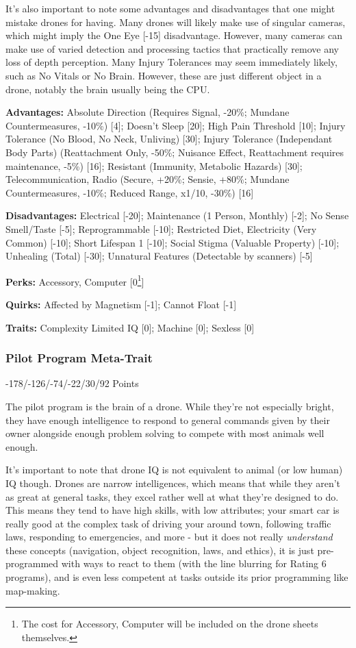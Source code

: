 It's also important to note some advantages and disadvantages that one might mistake drones for having. Many drones will likely make use of singular cameras, which might imply the One Eye [-15] disadvantage. However, many cameras can make use of varied detection and processing tactics that practically remove any loss of depth perception. Many Injury Tolerances may seem immediately likely, such as No Vitals or No Brain. However, these are just different object in a drone, notably the brain usually being the CPU.

\textbf{Advantages:} 
Absolute Direction (Requires Signal, -20\%; Mundane Countermeasures, -10\%) [4]; Doesn't Sleep [20]; High Pain Threshold [10]; Injury Tolerance (No Blood, No Neck, Unliving) [30]; Injury Tolerance (Independant Body Parts) (Reattachment Only, -50\%; Nuisance Effect, Reattachment requires maintenance, -5\%) [16]; Resistant (Immunity, Metabolic Hazards) [30]; Telecommunication, Radio (Secure, +20\%; Sensie, +80\%; Mundane Countermeasures, -10\%; Reduced Range, x1/10, -30\%) [16]

\textbf{Disadvantages:} 
Electrical [-20]; Maintenance (1 Person, Monthly) [-2]; No Sense Smell/Taste [-5]; Reprogrammable [-10]; Restricted Diet, Electricity (Very Common) [-10]; Short Lifespan 1 [-10]; Social Stigma (Valuable Property) [-10]; Unhealing (Total) [-30]; Unnatural Features (Detectable by scanners) [-5]

\textbf{Perks:}
Accessory, Computer [0\footnote{The cost for Accessory, Computer will be included on the drone sheets themselves.}]

\textbf{Quirks:}
Affected by Magnetism [-1]; Cannot Float [-1]

\textbf{Traits:}
Complexity Limited IQ [0]; Machine [0]; Sexless [0]

\subsubsection{Pilot Program Meta-Trait}
\begin{flushright}
	-178/-126/-74/-22/30/92 Points
\end{flushright}

The pilot program is the brain of a drone. While they're not especially bright, they have enough intelligence to respond to general commands given by their owner alongside enough problem solving to compete with most animals well enough. 

It's important to note that drone IQ is not equivalent to animal (or low human) IQ though. Drones are narrow intelligences, which means that while they aren't as great at general tasks, they excel rather well at what they're designed to do. This means they tend to have high skills, with low attributes; your smart car is really good at the complex task of driving your around town, following traffic laws, responding to emergencies, and more - but it does not really \textit{understand} these concepts (navigation, object recognition, laws, and ethics), it is just pre-programmed with ways to react to them (with the line blurring for Rating 6 programs), and is even less competent at tasks outside its prior programming like map-making.


